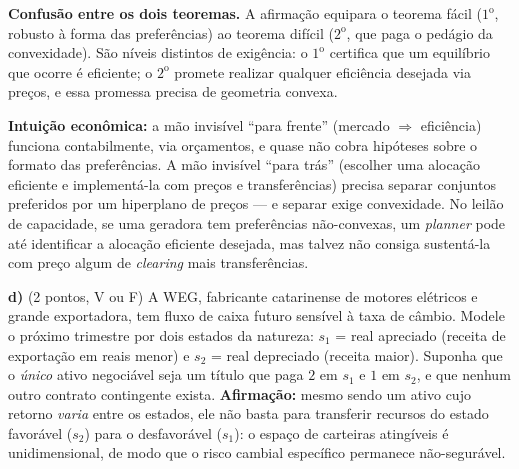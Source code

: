 \begin{solucao}
\textbf{Confusão entre os dois teoremas.} A afirmação equipara o teorema fácil ($1^{\text{o}}$, robusto à forma das preferências) ao teorema difícil ($2^{\text{o}}$, que paga o pedágio da convexidade). São níveis distintos de exigência: o $1^{\text{o}}$ certifica que um equilíbrio que ocorre é eficiente; o $2^{\text{o}}$ promete realizar qualquer eficiência desejada via preços, e essa promessa precisa de geometria convexa.

\textbf{Intuição econômica:} a mão invisível ``para frente'' (mercado $\Rightarrow$ eficiência) funciona contabilmente, via orçamentos, e quase não cobra hipóteses sobre o formato das preferências. A mão invisível ``para trás'' (escolher uma alocação eficiente e implementá-la com preços e transferências) precisa separar conjuntos preferidos por um hiperplano de preços --- e separar exige convexidade. No leilão de capacidade, se uma geradora tem preferências não-convexas, um \emph{planner} pode até identificar a alocação eficiente desejada, mas talvez não consiga sustentá-la com preço algum de \emph{clearing} mais transferências.
\end{solucao}

\textbf{d)} (2 pontos, V ou F) A WEG, fabricante catarinense de motores elétricos e grande exportadora, tem fluxo de caixa futuro sensível à taxa de câmbio. Modele o próximo trimestre por dois estados da natureza: $s_1$ = real apreciado (receita de exportação em reais menor) e $s_2$ = real depreciado (receita maior). Suponha que o \emph{único} ativo negociável seja um título que paga $2$ em $s_1$ e $1$ em $s_2$, e que nenhum outro contrato contingente exista. \textbf{Afirmação:} mesmo sendo um ativo cujo retorno \emph{varia} entre os estados, ele não basta para transferir recursos do estado favorável ($s_2$) para o desfavorável ($s_1$): o espaço de carteiras atingíveis é unidimensional, de modo que o risco cambial específico permanece não-segurável.

